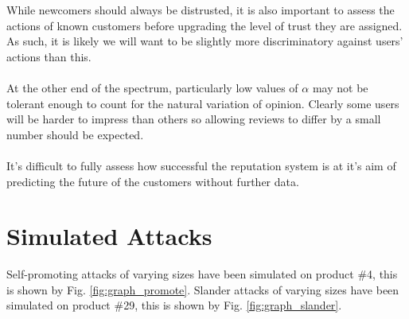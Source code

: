 \documentclass{article}
\begin{document}
While newcomers should always be distrusted\cite{reputation_systems}, it is also important to assess the actions of known customers before upgrading the level of trust they are assigned. As such, it is likely we will want to be slightly more discriminatory against users' actions than this.
\\\\
At the other end of the spectrum, particularly low values of $\alpha$ may not be tolerant enough to count for the natural variation of opinion. Clearly some users will be harder to impress than others so allowing reviews to differ by a small number should be expected.
\\\\
It's difficult to fully assess how successful the reputation system is at it's aim of predicting the future of the customers without further data.

\section{Simulated Attacks} %
\label{attacks}
Self-promoting attacks of varying sizes have been simulated on product \#4, this is shown by Fig. \ref{fig:graph_promote}.
Slander attacks of varying sizes have been simulated on product \#29, this is shown by Fig. \ref{fig:graph_slander}.
\end{document}
